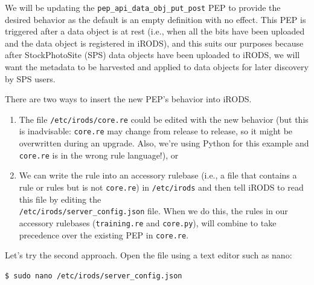 \documentclass[10pt,oneside]{memoir}
\begin{document}
\vspace{5mm}
\begin{lrbox}{\lstTrainingRuleBase}

\end{lrbox}
\href{https://raw.githubusercontent.com/irods/irods_training/ugm2022/beginner/training.re}{\usebox{\lstTrainingRuleBase}}

\vspace{5mm}
\begin{lrbox}{\lstPythonRulebase}

\end{lrbox}
\href{https://raw.githubusercontent.com/irods/irods_training/ugm2022/beginner/core.py}{\usebox{\lstPythonRulebase}}

We will be updating the \texttt{pep\_api\_data\_obj\_put\_post} PEP to provide the desired behavior as the default is an empty definition with no effect.  This PEP is triggered after a data object is at rest (i.e., when all the bits have been uploaded and the data object is registered in iRODS), and this suits our purposes because after StockPhotoSite (SPS) data objects have been uploaded to iRODS, we will want the metadata to be harvested and applied to data objects for later discovery by SPS users.

There are two ways to insert the new PEP's behavior into iRODS.
\begin{enumerate}
 \item The file \texttt{/etc/irods/core.re} could be edited with the new behavior (but this is inadvisable: \texttt{core.re} may change from release to release, so it might be overwritten during an upgrade.  Also, we're using Python for this example and \texttt{core.re} is in the wrong rule language!), or
 \item We can write the rule into an accessory rulebase (i.e., a file that contains a rule or rules but is not \texttt{core.re}) in \texttt{/etc/irods} and then tell iRODS to read this file by editing the \\ \texttt{/etc/irods/server\_config.json} file. When we do this, the rules in our accessory rulebases (\texttt{training.re} and \texttt{core.py}), will combine to take precedence over the existing PEP in \texttt{core.re}.
\end{enumerate}

Let's try the second approach. Open the file using a text editor such as nano:

\begin{lstlisting}
$ sudo nano /etc/irods/server_config.json
\end{lstlisting}
\end{document}
